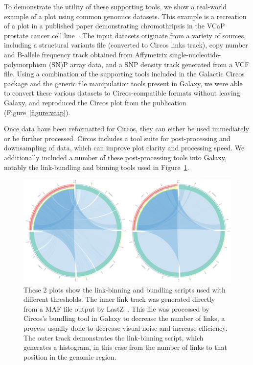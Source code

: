To demonstrate the utility of these supporting tools, we show a real-world example of a plot using common genomics datasets. This example is a recreation of a plot in a published paper demonstrating chromothripsis in the VCaP prostate cancer cell line~\cite{alves2013gene}. The input datasets originate from a variety of sources, including a structural variants file (converted to Circos links track), copy number and B-allele frequency track obtained from Affymetrix single-nucleotide-polymorphism (SN)P array data, and a SNP density track generated from a VCF file. Using a combination of the supporting tools included in the Galactic Circos package and the generic file manipulation tools present in Galaxy, we were able to convert these various datasets to Circos-compatible formats without leaving Galaxy, and reproduced the Circos plot from the publication (Figure~\ref{figure:vcap}).

Once data have been reformatted for Circos, they can either be used immediately or be further processed. Circos includes a tool suite for post-processing and downsampling of data, which can improve plot clarity and processing speed. We additionally included a number of these post-processing tools into Galaxy, notably the link-bundling and binning tools used in Figure~\ref{figure:binning-bundling}.

\begin{figure}[h!]
\centering
\includegraphics[width=\linewidth]{chapters/images/circos/binning-bundling.png}
\caption{These 2 plots show the link-binning and bundling scripts used with different thresholds. The inner link track was generated directly from a MAF file output by LastZ~\cite{rahmani2011lastz}. This file was processed by Circos's bundling tool in Galaxy to decrease the number of links, a process usually done to decrease visual noise and increase efficiency. The outer track demonstrates the link-binning script, which generates a histogram, in this case from the number of links to that position in the genomic region.}
\label{figure:binning-bundling}
\end{figure}

